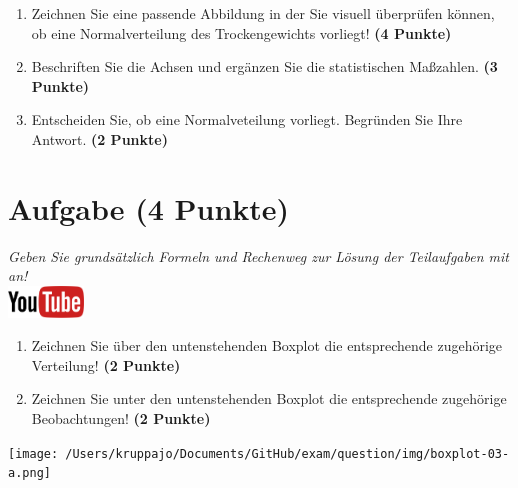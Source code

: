 \documentclass[a4paper, 10pt]{scrartcl}\usepackage[]{graphicx}\usepackage[]{xcolor}
\begin{document}
\begin{enumerate}
\item Zeichnen Sie eine passende Abbildung in der Sie visuell {\"u}berpr{\"u}fen
  k{\"o}nnen, ob eine Normalverteilung des Trockengewichts vorliegt! \textbf{(4
    Punkte)}
\item Beschriften Sie die Achsen und erg{\"a}nzen Sie die statistischen
  Ma{\ss}zahlen. \textbf{(3 Punkte)}
\item Entscheiden Sie, ob eine Normalveteilung vorliegt. Begr{\"u}nden Sie Ihre
  Antwort. \textbf{(2 Punkte)}
\end{enumerate} 
\clearpage

\section{Aufgabe \hfill (4 Punkte)}

\textit{Geben Sie grunds{\"a}tzlich Formeln und Rechenweg zur L{\"o}sung der
  Teilaufgaben mit an!} \\[1Ex]

\hfill\href{https://youtu.be/Op-gjzASH9I}{\includegraphics[width =
  2cm]{img/youtube}}\\[1Ex]



\begin{enumerate}
\item Zeichnen Sie {\"u}ber den untenstehenden Boxplot die entsprechende
  zugeh{\"o}rige Verteilung! \textbf{(2 Punkte)} 
\item Zeichnen Sie unter den untenstehenden Boxplot die entsprechende
  zugeh{\"o}rige Beobachtungen! \textbf{(2 Punkte)}
\end{enumerate}

\vspace*{8cm}

\begin{center}
  \texttt{[image: /Users/kruppajo/Documents/GitHub/exam/question/img/boxplot-03-a.png]}
\end{center}



 
\clearpage
\end{document}
